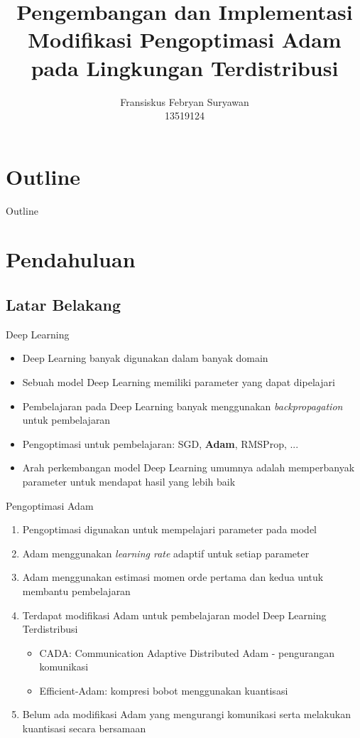 \documentclass[aspectratio=169]{beamer}
\title[Modifikasi Adam]{Pengembangan dan Implementasi Modifikasi Pengoptimasi Adam pada Lingkungan Terdistribusi}
\author[]{
  Fransiskus Febryan Suryawan\\
  13519124
}
\institute{Institut Teknologi Bandung}
\date{}
\begin{document}
{
\makeatletter
\setlength{\hoffset}{-.5\beamer@sidebarwidth}
\makeatother
\begin{frame}[plain]
  \titlepage
\end{frame}
}

\section*{Outline}
\begin{frame}{Outline}
  \begin{center}
    \tableofcontents
  \end{center}
\end{frame}

\section{Pendahuluan}
\subsection{Latar Belakang}
\begin{frame}{Deep Learning}
  \begin{itemize}
    \item Deep Learning banyak digunakan dalam banyak domain
    \item Sebuah model Deep Learning memiliki parameter yang dapat dipelajari
    \item Pembelajaran pada Deep Learning banyak menggunakan \textit{backpropagation} untuk pembelajaran
    \item Pengoptimasi untuk pembelajaran: SGD, \textbf{Adam}, RMSProp, ...
    \item Arah perkembangan model Deep Learning umumnya adalah memperbanyak parameter untuk mendapat hasil yang lebih baik
  \end{itemize}
\end{frame}

\begin{frame}{Pengoptimasi Adam}
  \begin{enumerate}
    \item Pengoptimasi digunakan untuk mempelajari parameter pada model
    \item Adam \parencite{ADAMKingma} menggunakan \textit{learning rate} adaptif untuk setiap parameter
    \item Adam menggunakan estimasi momen orde pertama dan kedua untuk membantu pembelajaran
    \item Terdapat modifikasi Adam untuk pembelajaran model Deep Learning Terdistribusi
          \begin{itemize}
            \item CADA: Communication Adaptive Distributed Adam - pengurangan komunikasi \parencite{Chen2021CADA}
            \item Efficient-Adam: kompresi bobot menggunakan kuantisasi \parencite{Chen2022Efficient}
          \end{itemize}
    \item Belum ada modifikasi Adam yang mengurangi komunikasi serta melakukan kuantisasi secara bersamaan
  \end{enumerate}
\end{frame}
\end{document}
